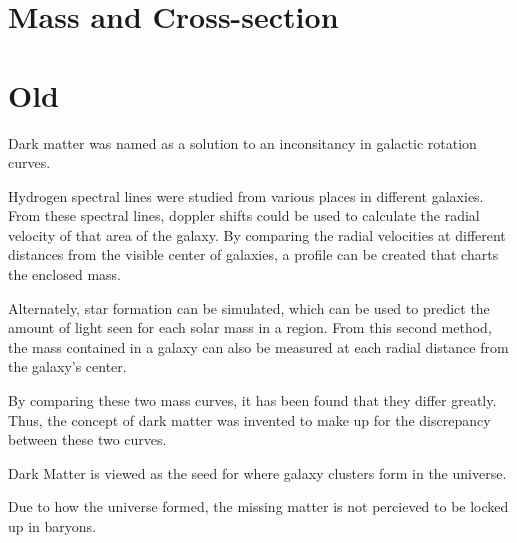 \section{Mass and Cross-section}


\section{Old}

Dark matter was named as a solution to an inconsitancy in galactic rotation curves.

Hydrogen spectral lines were studied from various places in different galaxies.
From these spectral lines, doppler shifts could be used to calculate the radial velocity of that area of the galaxy.
By comparing the radial velocities at different distances from the visible center of galaxies, a profile can be created that charts the enclosed mass.

Alternately, star formation can be simulated, which can be used to predict the amount of light seen for each solar mass in a region.
From this second method, the mass contained in a galaxy can also be measured at each radial distance from the galaxy's center.

By comparing these two mass curves, it has been found that they differ greatly.
Thus, the concept of dark matter was invented to make up for the discrepancy between these two curves.




Dark Matter is viewed as the seed for where galaxy clusters form in the universe.


Due to how the universe formed, the missing matter is not percieved to be locked up in baryons.

